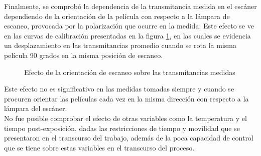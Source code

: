 Finalmente, se comprobó la dependencia de la transmitancia medida en el escáner dependiendo de la orientación de la película con respecto a la lámpara de escaneo, provocada por la polarización que ocurre en la medida. Este efecto se ve en las curvas de calibración presentadas en la figura \ref{fig:efectoOrientacion}, en las cuales se evidencia un desplazamiento en las transmitancias promedio cuando se rota la misma película 90 grados en la misma posición de escaneo.\\
\begin{figure}[H]
	\centering
	\hfill
	\caption{Efecto de la orientación de escaneo sobre las transmitancias medidas}
	\label{fig:efectoOrientacion}
\end{figure}
Este efecto no es significativo en las medidas tomadas siempre y cuando se procuren orientar las películas cada vez en la misma dirección con respecto a la lámpara del escáner.\\

No fue posible comprobar el efecto de otras variables como la temperatura y el tiempo post-exposición, dadas las restricciones de tiempo y movilidad que se presentaron en el transcurso del trabajo, además de la poca capacidad de control que se tiene sobre estas variables en el transcurso del proceso.\\

